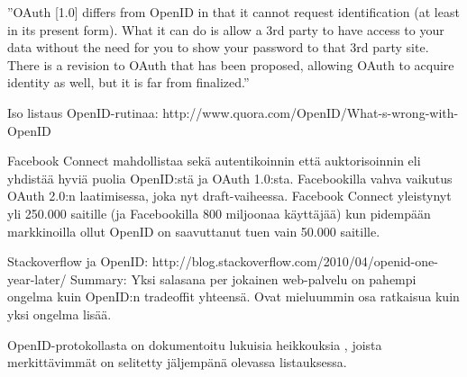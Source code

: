 \documentclass[english,gradu]{tktltiki}
\begin{document}
''OAuth [1.0] differs from OpenID in that it cannot request identification (at least in its present form). What it can do is allow a 3rd party to have access to your data without the need for you to show your password to that 3rd party site. There is a revision to OAuth that has been proposed, allowing OAuth to acquire identity as well, but it is far from finalized.''

Iso listaus OpenID-rutinaa: http://www.quora.com/OpenID/What-s-wrong-with-OpenID

Facebook Connect mahdollistaa sekä autentikoinnin että auktorisoinnin eli yhdistää hyviä puolia OpenID:stä ja OAuth 1.0:sta. Facebookilla vahva vaikutus OAuth 2.0:n laatimisessa, joka nyt draft-vaiheessa. Facebook Connect yleistynyt yli 250.000 saitille (ja Facebookilla 800 miljoonaa käyttäjää) kun pidempään markkinoilla ollut OpenID on saavuttanut tuen vain 50.000 saitille.


Stackoverflow ja OpenID: http://blog.stackoverflow.com/2010/04/openid-one-year-later/
Summary: Yksi salasana per jokainen web-palvelu on pahempi ongelma kuin OpenID:n tradeoffit yhteensä. Ovat mieluummin osa ratkaisua kuin yksi ongelma lisää.


OpenID-protokollasta on dokumentoitu lukuisia heikkouksia \cite{blackhat_openid_security_story, cameron_infocard_07, three_types_of_openid_ids_10}, joista merkittävimmät on selitetty jäljempänä olevassa listauksessa.
\end{document}
